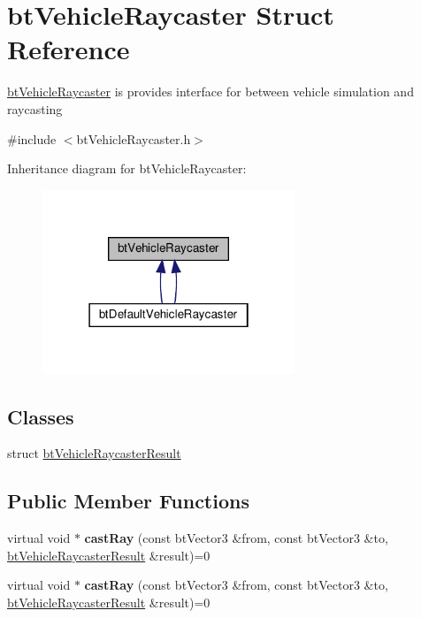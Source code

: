 \hypertarget{structbtVehicleRaycaster}{}\section{bt\+Vehicle\+Raycaster Struct Reference}
\label{structbtVehicleRaycaster}


\hyperlink{structbtVehicleRaycaster}{bt\+Vehicle\+Raycaster} is provides interface for between vehicle simulation and raycasting  




{\ttfamily \#include $<$bt\+Vehicle\+Raycaster.\+h$>$}



Inheritance diagram for bt\+Vehicle\+Raycaster\+:
\nopagebreak
\begin{figure}[H]
\begin{center}
\leavevmode
\includegraphics[width=214pt]{structbtVehicleRaycaster__inherit__graph}
\end{center}
\end{figure}
\subsection*{Classes}
\begin{DoxyCompactItemize}
\item 
struct \hyperlink{structbtVehicleRaycaster_1_1btVehicleRaycasterResult}{bt\+Vehicle\+Raycaster\+Result}
\end{DoxyCompactItemize}
\subsection*{Public Member Functions}
\begin{DoxyCompactItemize}
\item 
\mbox{\label{structbtVehicleRaycaster_a48bcd58b09c3c72a0a548d757318a373}} 
virtual void $\ast$ {\bfseries cast\+Ray} (const bt\+Vector3 \&from, const bt\+Vector3 \&to, \hyperlink{structbtVehicleRaycaster_1_1btVehicleRaycasterResult}{bt\+Vehicle\+Raycaster\+Result} \&result)=0
\item 
\mbox{\label{structbtVehicleRaycaster_a48bcd58b09c3c72a0a548d757318a373}} 
virtual void $\ast$ {\bfseries cast\+Ray} (const bt\+Vector3 \&from, const bt\+Vector3 \&to, \hyperlink{structbtVehicleRaycaster_1_1btVehicleRaycasterResult}{bt\+Vehicle\+Raycaster\+Result} \&result)=0
\end{DoxyCompactItemize}


